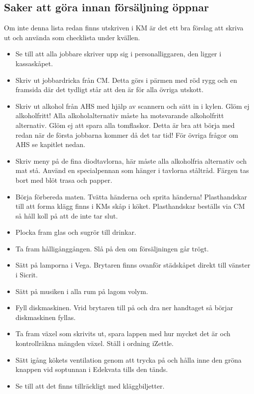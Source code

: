 \documentclass[10pt]{article}
\begin{document}
    \subsection{Saker att göra innan försäljning öppnar}
    Om inte denna lista redan finns utskriven i KM är det ett bra förslag att skriva ut och använda som checklista under kvällen.
    \begin{itemize}
        \item Se till att alla jobbare skriver upp sig i personalliggaren, den ligger i kassaskåpet.
        \item Skriv ut jobbardricka från CM. Detta görs i pärmen med röd rygg och en framsida där det tydligt står att den är för alla övriga utskott.
        \item Skriv ut alkohol från AHS med hjälp av scannern och sätt in i kylen. Glöm ej alkoholfritt! Alla alkoholalternativ måste ha motsvarande alkoholfritt alternativ. Glöm ej att spara alla tomflaskor. Detta är bra att börja med redan när de första jobbarna kommer då det tar tid! För övriga frågor om AHS se kapitlet nedan.
        \item Skriv meny på de fina diodtavlorna, här måste alla alkoholfria alternativ och mat stå. Använd en specialpennan som hänger i tavlorna ståltråd. Färgen tas bort med blöt trasa och papper.
        \item Börja förbereda maten. Tvätta händerna och sprita händerna! Plasthandskar till att forma klägg finns i KMs
    skåp i köket. Plasthandskar beställs via CM så håll koll på att de inte tar slut.
        \item Plocka fram glas och sugrör till drinkar.
        \item Ta fram hålligånggången. Slå på den om försäljningen går trögt.
        \item Sätt på lamporna i Vega. Brytaren finns ovanför städskåpet direkt till vänster i Sicrit.
        \item Sätt på musiken i alla rum på lagom volym.
        \item Fyll diskmaskinen. Vrid brytaren till på och dra ner handtaget så börjar diskmaskinen fyllas.
        \item Ta fram växel som skrivits ut, spara lappen med hur mycket det är och kontrollräkna mängden växel. Ställ i ordning iZettle.
        \item Sätt igång kökets ventilation genom att trycka på och hålla inne den gröna knappen vid soptunnan i Edekvata tills den tänds.
        \item Se till att det finns tillräckligt med kläggbiljetter.

\end{itemize}
\end{document}
